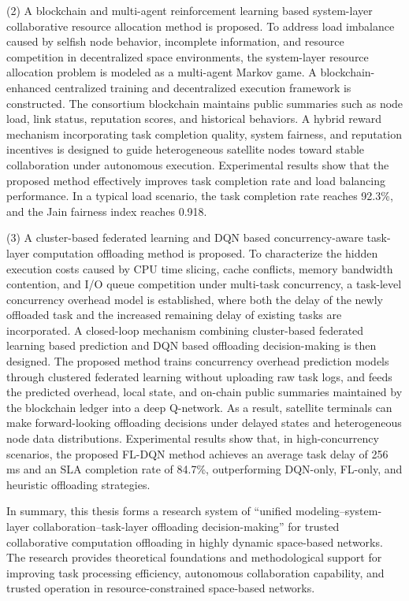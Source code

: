 \begin{abstractEn}
  (2) A blockchain and multi-agent reinforcement learning based system-layer collaborative resource allocation method is proposed. To address load imbalance caused by selfish node behavior, incomplete information, and resource competition in decentralized space environments, the system-layer resource allocation problem is modeled as a multi-agent Markov game. A blockchain-enhanced centralized training and decentralized execution framework is constructed. The consortium blockchain maintains public summaries such as node load, link status, reputation scores, and historical behaviors. A hybrid reward mechanism incorporating task completion quality, system fairness, and reputation incentives is designed to guide heterogeneous satellite nodes toward stable collaboration under autonomous execution. Experimental results show that the proposed method effectively improves task completion rate and load balancing performance. In a typical load scenario, the task completion rate reaches 92.3\%, and the Jain fairness index reaches 0.918.

  (3) A cluster-based federated learning and DQN based concurrency-aware task-layer computation offloading method is proposed. To characterize the hidden execution costs caused by CPU time slicing, cache conflicts, memory bandwidth contention, and I/O queue competition under multi-task concurrency, a task-level concurrency overhead model is established, where both the delay of the newly offloaded task and the increased remaining delay of existing tasks are incorporated. A closed-loop mechanism combining cluster-based federated learning based prediction and DQN based offloading decision-making is then designed. The proposed method trains concurrency overhead prediction models through clustered federated learning without uploading raw task logs, and feeds the predicted overhead, local state, and on-chain public summaries maintained by the blockchain ledger into a deep Q-network. As a result, satellite terminals can make forward-looking offloading decisions under delayed states and heterogeneous node data distributions. Experimental results show that, in high-concurrency scenarios, the proposed FL-DQN method achieves an average task delay of 256 ms and an SLA completion rate of 84.7\%, outperforming DQN-only, FL-only, and heuristic offloading strategies.

  In summary, this thesis forms a research system of “unified modeling--system-layer collaboration--task-layer offloading decision-making” for trusted collaborative computation offloading in highly dynamic space-based networks. The research provides theoretical foundations and methodological support for improving task processing efficiency, autonomous collaboration capability, and trusted operation in resource-constrained space-based networks.
\end{abstractEn}

